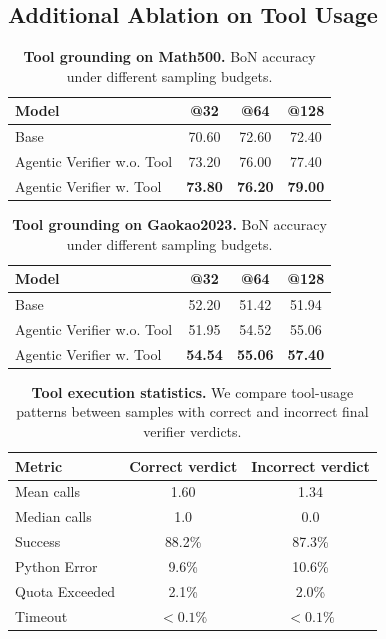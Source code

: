 \documentclass[11pt]{article}
\begin{document}
\subsection{Additional Ablation on Tool Usage}
\label{sec:appendix_tool}

\begin{table}[t]
\centering
\small
\begin{tabular}{lccc}
\toprule
Model & @32 & @64 & @128 \\
\midrule
Base & 70.60 & 72.60 & 72.40 \\
Agentic Verifier w.o. Tool & 73.20 & 76.00 & 77.40 \\
Agentic Verifier w. Tool & \textbf{73.80} & \textbf{76.20} & \textbf{79.00} \\
\bottomrule
\end{tabular}
\caption{\textbf{Tool grounding on Math500.} BoN accuracy under different sampling budgets.}
\label{tab:tool_ablation_math}
\end{table}

\begin{table}[t]
\centering
\small
\begin{tabular}{lccc}
\toprule
Model & @32 & @64 & @128 \\
\midrule
Base & 52.20 & 51.42 & 51.94 \\
Agentic Verifier w.o. Tool & 51.95 & 54.52 & 55.06 \\
Agentic Verifier w. Tool & \textbf{54.54} & \textbf{55.06} & \textbf{57.40} \\
\bottomrule
\end{tabular}
\caption{\textbf{Tool grounding on Gaokao2023.} BoN accuracy under different sampling budgets.}
\label{tab:tool_ablation_gaokao}
\end{table}

\begin{table}[t]
\centering
\small
\begin{tabular}{lcc}
\toprule
Metric & Correct verdict & Incorrect verdict \\
\midrule
Mean calls & 1.60 & 1.34 \\
Median calls & 1.0 & 0.0 \\
Success & 88.2\% & 87.3\% \\
Python Error & 9.6\% & 10.6\% \\
Quota Exceeded  & 2.1\% & 2.0\% \\
Timeout & $<0.1\%$ & $<0.1\%$ \\
\bottomrule
\end{tabular}
\caption{\textbf{Tool execution statistics.} We compare tool-usage patterns between samples with correct and incorrect final verifier verdicts.}
\label{tab:tool_stats}
\end{table}
\end{document}
